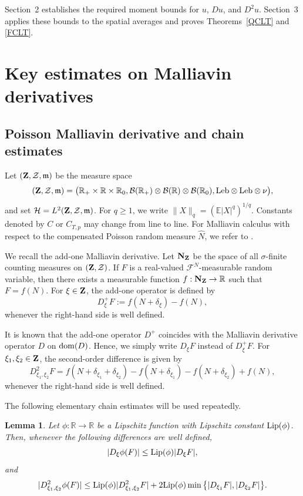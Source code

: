 \documentclass[12pt]{article}
\newtheorem{lemma}[theorem]{Lemma}
\def\cB{\mathcal{B}}
\def\cF{\mathcal{F}}
\def\cH{\mathcal{H}}
\def\cZ{\mathcal{Z}}
\def\bE{\mathbb{E}}
\def\bR{\mathbb{R}}
\newcommand{\fm}{\mathfrak{m}}
\begin{document}
Section~2 establishes the required moment bounds for $u$, $Du$, and
$D^2u$. Section~3 applies these bounds to the spatial averages and proves
Theorems~\ref{QCLT} and \ref{FCLT}.


\section{Key estimates on Malliavin derivatives}
\subsection{Poisson Malliavin derivative and chain estimates}
Let $({\bf Z},\cZ,\fm)$ be the measure space
\[
({\bf Z},\cZ,\fm)
=\big(\bR_+\times\bR\times\bR_0,
\cB(\bR_+)\otimes\cB(\bR)\otimes\cB(\bR_0),
{\rm Leb}\otimes{\rm Leb}\otimes\nu\big),
\]
 and set $\cH=L^2({\bf Z},\cZ,\fm)$. For $q\ge1$, we write
$\|X\|_q=(\bE|X|^q)^{1/q}$. Constants denoted by $C$ or $C_{T,p}$ may
change from line to line. For Malliavin calculus with respect to the
compensated Poisson random measure $\widehat N$, we refer to \cite{NN18}.

\medskip

We recall the add-one Malliavin derivative. Let ${\bf N}_{\bf Z}$ be the space of all $\sigma$-finite counting measures
on $({\bf Z},\cZ)$. If $F$ is a real-valued $\cF^N$-measurable random
variable, then there exists a measurable function
$f:{\bf N}_{\bf Z}\to\bR$ such that $F=f(N)$. For $\xi\in{\bf Z}$, the
add-one operator is defined by
\begin{equation}
\label{add-one}
D_\xi^+F
:=
f(N+\delta_\xi)-f(N),
\end{equation}
whenever the right-hand side is well defined. 

It is known that the add-one operator $D^+$ coincides with the Malliavin
derivative operator $D$ on ${\rm dom}(D)$. Hence, we simply
write $D_\xi F$ instead of $D_\xi^+F$. For $\xi_1,\xi_2\in{\bf Z}$, the
second-order difference is given by
\begin{equation}
\label{second-add-one}
D^2_{\xi_1,\xi_2}F
=
f(N+\delta_{\xi_1}+\delta_{\xi_2})
-
f(N+\delta_{\xi_1})
-
f(N+\delta_{\xi_2})
+
f(N),
\end{equation}
whenever the right-hand side is well defined.

The following elementary chain estimates will be used repeatedly.

\begin{lemma}
\label{lem:chain-estimates}
Let $\phi:\bR\to\bR$ be a Lipschitz function with Lipschitz constant
${\rm Lip}(\phi)$. Then, whenever the following differences are well defined,
\begin{equation}
\label{D-chain}
|D_\xi\phi(F)|
\le
{\rm Lip}(\phi)|D_\xi F|,
\end{equation}
and
\begin{equation}
\label{D2-chain}
|D^2_{\xi_1,\xi_2}\phi(F)|
\le
{\rm Lip}(\phi)|D^2_{\xi_1,\xi_2}F|
+
2{\rm Lip}(\phi)
\min\big\{
|D_{\xi_1}F|,
|D_{\xi_2}F|
\big\}.
\end{equation}
\end{lemma}
\end{document}

